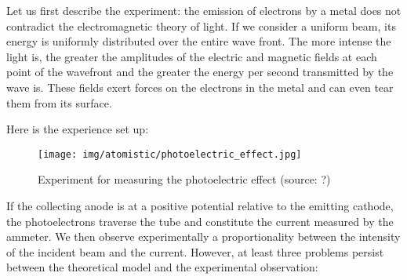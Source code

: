 	Let us first describe the experiment: the emission of electrons by a metal does not contradict the electromagnetic theory of light. If we consider a uniform beam, its energy is uniformly distributed over the entire wave front. The more intense the light is, the greater the amplitudes of the electric and magnetic fields at each point of the wavefront and the greater the energy per second transmitted by the wave is. These fields exert forces on the electrons in the metal and can even tear them from its surface.

	Here is the experience set up:
	\begin{figure}[H]
		\centering
		\texttt{[image: img/atomistic/photoelectric\_effect.jpg]}
		\caption[Experiment for measuring the photoelectric effect]{Experiment for measuring the photoelectric effect (source: ?)}
	\end{figure}
	If the collecting anode is at a positive potential relative to the emitting cathode, the photoelectrons traverse the tube and constitute the current measured by the ammeter. We then observe experimentally a proportionality between the intensity of the incident beam and the current.
	However, at least three problems persist between the theoretical model and the experimental observation:
